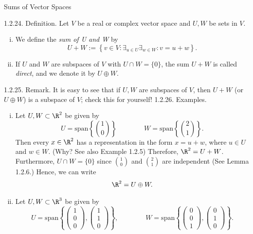 \documentclass[smaller,hyperref={CJKbookmarks=true}]{beamer}
\begin{document}
\begin{frame}{Sums of Vector Spaces} \begin{spacing}{1.1}
\alert{1.2.24. Definition.} Let $V$ be a real or complex vector space and $U,W$ be sets in $V$.
\begin{enumerate}[(i)]
  \item We define the \emph{sum of U and W} by
      \[U+W:=\left\{v\in V:\mathop{\exists}_{u\in U}\mathop{\exists}_{w\in W}: v=u+w\right\}.\]
  \item If $U$ and $W$ are subspaces of $V$ with $U\cap W=\{0\}$, the sum $U+W$ is called \emph{direct}, and we denote it by $U\oplus W$.
\end{enumerate} \vspace*{12pt}
\alert{1.2.25. Remark.} It is easy to see that if $U,W$ are subspaces of $V$, then $U+W$ (or $U\oplus W$) is a subspace of $V$; check this for yourself!
\newpage
\alert{1.2.26. Examples.}\\
\begin{enumerate}[(i)]
  \item Let $U,W\subset\R^2$ be given by
      \[U=\text{span}\left\{\binom{1}{0}\right\}\qquad\qquad W=\text{span}\left\{\binom{2}{1}\right\}.\]
      Then every $x\in\R^2$ has a representation in the form $x=u+w$, where $u\in U$ and $w\in W$. (Why? See also Example 1.2.5) Therefore, $\R^2=U+W$.\\[11pt]
      Furthermore, $U\cap W=\{0\}$ since $\binom{1}{0}$ and $\binom{2}{1}$ are independent (See Lemma 1.2.6.) Hence, we can write
      \[\R^2=U\oplus W.\] \newpage
  \item Let $U,W\subset\R^3$ be given by
      \[U=\text{span}\left\{\begin{pmatrix}
      1 \\0 \\ 0\end{pmatrix},\begin{pmatrix}
      1 \\1 \\0\end{pmatrix}\right\},\qquad\qquad W=\text{span}\left\{\begin{pmatrix}
      0 \\0 \\1\end{pmatrix},\begin{pmatrix}
      0 \\1 \\0\end{pmatrix}\right\}.\]

\end{enumerate}
\end{spacing}
\end{frame}
\end{document}

